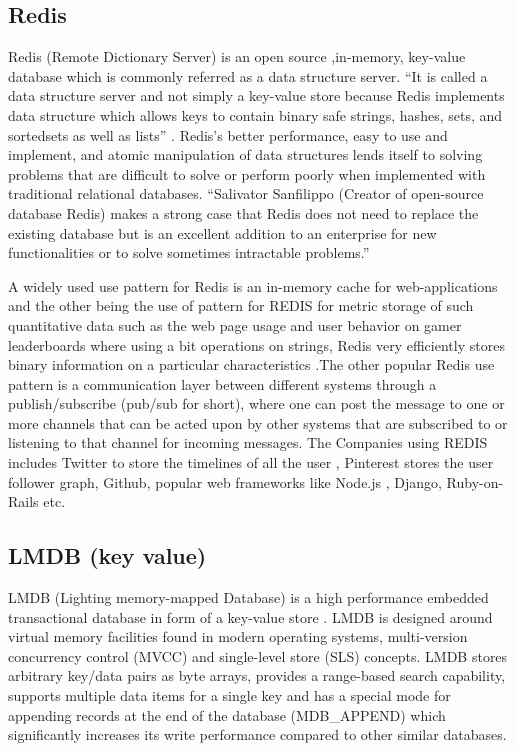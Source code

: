 \subsection{ Redis}

     Redis (Remote Dictionary Server) is an open source ,in-memory,
     key-value database which is commonly referred as a data structure
     server. ``It is called a data structure server and not simply a
     key-value store because Redis implements data structure which
     allows keys to contain binary safe strings, hashes, sets, and
     sortedsets as well as lists'' \cite{redis-book-2011}.  Redis's
     better performance, easy to use and implement, and atomic
     manipulation of data structures lends itself to solving problems
     that are difficult to solve or perform poorly when implemented
     with traditional relational databases. ``Salivator
     Sanfilippo (Creator of open-source database Redis) makes a strong
     case that Redis does not need to replace the existing database
     but is an excellent addition to an enterprise for new
     functionalities or to solve sometimes intractable problems.''
     \cite{redis-book-2016}

     A widely used use pattern for Redis is an in-memory cache for
     web-applications and the other being the use of pattern for REDIS
     for metric storage of such quantitative data such as the web page
     usage and user behavior on gamer leaderboards where using a bit
     operations on strings, Redis very efficiently stores binary
     information on a particular characteristics
     \cite{redis-book-2016}.The other popular Redis use pattern is a
     communication layer between different systems through a
     publish/subscribe (pub/sub for short), where one can post the message
     to one or more channels that can be acted upon by other systems
     that are subscribed to or listening to that channel for incoming
     messages. The Companies using REDIS includes Twitter to store the
     timelines of all the user , Pinterest stores the user follower
     graph, Github, popular web frameworks like Node.js
     , Django, Ruby-on-Rails etc.

\subsection{ LMDB (key value)}

     LMDB (Lighting memory-mapped Database) is a high performance
     embedded transactional database in form of a key-value store
     \cite{www-keyvalue}. LMDB is designed around virtual memory
     facilities found in modern operating systems, multi-version
     concurrency control (MVCC) and single-level store (SLS)
     concepts. LMDB stores arbitrary key/data pairs as byte arrays,
     provides a range-based search capability, supports multiple data
     items for a single key and has a special mode for appending
     records at the end of the database (MDB\_APPEND) which
     significantly increases its write performance compared to other
     similar databases.

